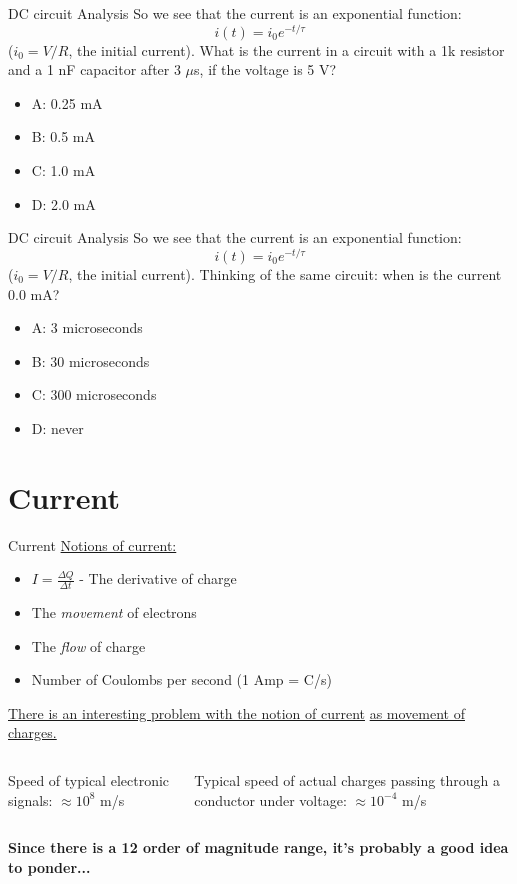 \documentclass{beamer}
\begin{document}
\begin{frame}{DC circuit Analysis}
So we see that the current is an exponential function:
\begin{equation}
i(t) = i_0 e^{-t/\tau}
\end{equation}
($i_0 = V/R$, the initial current).  What is the current in a circuit with a 1k resistor and a 1 nF capacitor after 3 $\mu$s, if the voltage is 5 V?
\begin{itemize}
\item A: 0.25 mA
\item B: 0.5 mA
\item C: 1.0 mA
\item D: 2.0 mA
\end{itemize}
\end{frame}

\begin{frame}{DC circuit Analysis}
So we see that the current is an exponential function:
\begin{equation}
i(t) = i_0 e^{-t/\tau}
\end{equation}
($i_0 = V/R$, the initial current).  Thinking of the same circuit: when is the current 0.0 mA?
\begin{itemize}
\item A: 3 microseconds
\item B: 30 microseconds
\item C: 300 microseconds
\item D: never
\end{itemize}
\end{frame}

\section{Current}

\begin{frame}{Current}
\underline{Notions of current:}
\begin{itemize}
	\item $I = \frac{\Delta Q}{\Delta t}$ - The derivative of charge
	\item The \textit{movement} of electrons
	\item The \textit{flow} of charge
	\item Number of Coulombs per second (1 Amp = C/s)
\end{itemize}
\underline{There is an interesting problem with the notion of current} \underline{as movement of charges.} \\ \vspace{0.5cm}
\begin{columns}[T]
\begin{column}{0.5\textwidth}
Speed of typical electronic signals: $\approx 10^{8}$ m/s
\end{column}
\begin{column}{0.5\textwidth}
Typical speed of actual charges passing through a conductor under voltage: $\approx 10^{-4}$ m/s
\end{column}
\end{columns} \vspace{0.25cm}
\textbf{Since there is a 12 order of magnitude range, it's probably a good idea to ponder...}
\end{frame}
\end{document}

